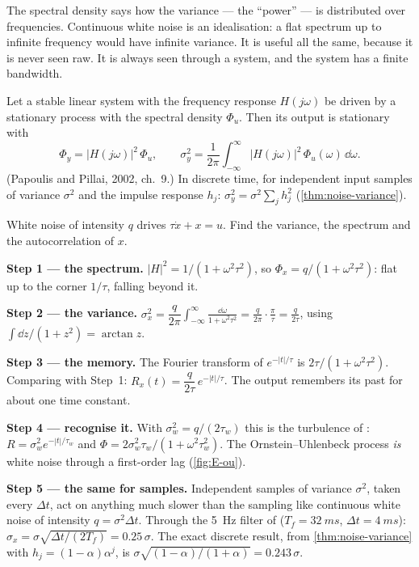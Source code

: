 The spectral density says how the variance — the \enquote{power} — is distributed over frequencies. Continuous white noise is an idealisation: a flat spectrum up to infinite frequency would have infinite variance. It is useful all the same, because it is never seen raw. It is always seen through a system, and the system has a finite bandwidth.

\begin{theorem}
\label{thm:E-psd}
Let a stable linear system with the frequency response $H(j\omega)$ be driven by a stationary process with the spectral density $\Phi_u$. Then its output is stationary with
\begin{equation}\label{eq:E-psd}
  \Phi_y = |H(j\omega)|^2\,\Phi_u, \qquad \sigma_y^2 = \frac{1}{2\pi}\int_{-\infty}^{\infty}|H(j\omega)|^2\,\Phi_u(\omega)\,\dd\omega .
\end{equation}
(Papoulis and Pillai, 2002, ch.~9.) In discrete time, for independent input samples of variance $\sigma^2$ and the impulse response $h_j$: $\sigma_y^2 = \sigma^2\sum_j h_j^2$ (\cref{thm:noise-variance}).
\end{theorem}

\begin{example}
\label{ex:E-lag}
White noise of intensity $q$ drives $\tau\dot x + x = u$. Find the variance, the spectrum and the autocorrelation of $x$.

\textbf{Step 1 — the spectrum.} $|H|^2 = 1/(1 + \omega^2\tau^2)$, so $\Phi_x = q/(1 + \omega^2\tau^2)$: flat up to the corner $1/\tau$, falling beyond it.

\textbf{Step 2 — the variance.} $\sigma_x^2 = \dfrac{q}{2\pi}\displaystyle\int_{-\infty}^{\infty}\frac{\dd\omega}{1 + \omega^2\tau^2} = \frac{q}{2\pi} \cdot \frac{\pi}{\tau} = \frac{q}{2\tau}$, using $\int\dd z/(1 + z^2) = \arctan z$.

\textbf{Step 3 — the memory.} The Fourier transform of $e^{-|t|/\tau}$ is $2\tau/(1 + \omega^2\tau^2)$. Comparing with Step~1: $R_x(t) = \dfrac{q}{2\tau}\,e^{-|t|/\tau}$. The output remembers its past for about one time constant.

\textbf{Step 4 — recognise it.} With $\sigma_w^2 = q/(2\tau_w)$ this is the turbulence of : $R = \sigma_w^2e^{-|t|/\tau_w}$ and $\Phi = 2\sigma_w^2\tau_w/(1 + \omega^2\tau_w^2)$. The Ornstein–Uhlenbeck process \emph{is} white noise through a first-order lag (\cref{fig:E-ou}).

\textbf{Step 5 — the same for samples.} Independent samples of variance $\sigma^2$, taken every $\Delta t$, act on anything much slower than the sampling like continuous white noise of intensity $q = \sigma^2\Delta t$. Through the \SI{5}{Hz} filter of  ($T_f = \SI{32}{ms}$, $\Delta t = \SI{4}{ms}$): $\sigma_x = \sigma\sqrt{\Delta t/(2T_f)} = 0.25\,\sigma$. The exact discrete result, from \cref{thm:noise-variance} with $h_j = (1 - \alpha)\alpha^j$, is $\sigma\sqrt{(1 - \alpha)/(1 + \alpha)} = 0.243\,\sigma$.
\end{example}

